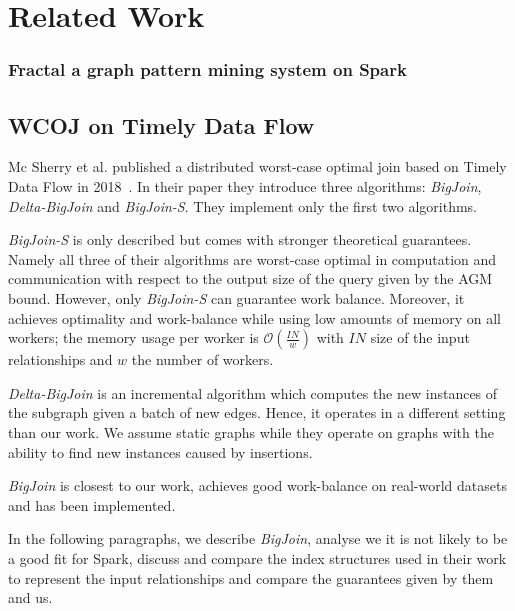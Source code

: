 \section{Related Work} \label{sec:related-work}






\subsubsection{Fractal a graph pattern mining system on Spark}

\subsection{\textsc{WCOJ} on Timely Data Flow}\label{subsec:wcoj-timely-data-flow}

Mc Sherry et al. published a distributed worst-case optimal join based on Timely Data Flow in 2018~\cite{ammar2018distributed,naiad}.
In their paper they introduce three algorithms: \textit{BigJoin}, \textit{Delta-BigJoin} and \textit{BigJoin-S}.
They implement only the first two algorithms.

\textit{BigJoin-S} is only described but comes with stronger theoretical guarantees.
Namely all three of their algorithms are worst-case optimal in computation and communication with respect to the output size of the query
given by the AGM bound.
However, only \textit{BigJoin-S} can guarantee work balance.
Moreover, it achieves optimality and work-balance while using low amounts of memory on all workers;
the memory usage per worker is $\mathcal{O} (\frac{IN}{w})$ with $IN$ size of the input relationships and $w$ the number of workers.

\textit{Delta-BigJoin} is an incremental algorithm which computes the new instances of the subgraph given a batch of new edges.
Hence, it operates in a different setting than our work.
We assume static graphs while they operate on graphs with the ability to find new instances caused by insertions.

\textit{BigJoin} is closest to our work, achieves good work-balance on real-world datasets and has been implemented.

In the following paragraphs, we describe \textit{BigJoin}, analyse we it is not likely to be a good fit for Spark,
discuss and compare the index structures used in their work to represent the input relationships and compare the
guarantees given by them and us.

